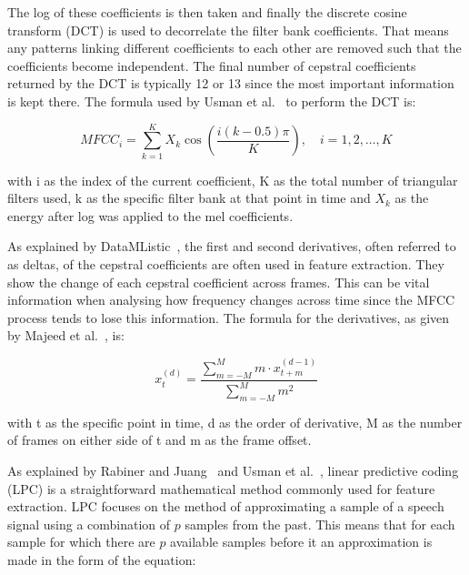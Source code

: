 The log of these coefficients is then taken and finally the discrete cosine transform 
(\acs{DCT}) is used to decorrelate the filter bank coefficients. That means any patterns linking different coefficients to each 
other are removed such that the coefficients become independent. 
The final number of cepstral 
coefficients returned by the \acs{DCT} is typically 12 or 13 since the most important information 
is kept there. The formula used by Usman et al.~\cite{Det_Tech} to perform the \acs{DCT} is:

\begin{equation}
    MFCC_i = \sum_{k=1}^{K} X_k \cos\left(\frac{i(k - 0.5)\pi}{K}\right), \quad i = 1, 2, \dots, K
\end{equation}

with i as the index of the current coefficient, K as the total number of triangular filters 
used, k as the specific filter bank at that point in time and $X_k$ as the energy after log was 
applied to the mel coefficients.

As explained by DataMListic~\cite{deltas}\cite{mel_delta}, the first and second derivatives, often referred to as deltas, of the cepstral coefficients 
are often used in feature extraction. They show the change of each cepstral coefficient across frames. This can be vital information when analysing how frequency changes across 
time since the \acs{MFCC} process tends to lose this information. The formula for the derivatives, 
as given by Majeed et al.~\cite{melderv_calcs}, 
is:

\begin{equation}
    x^{(d)}_t = \frac{\sum_{m=-M}^{M} m \cdot x^{(d-1)}_{t+m}}{\sum_{m=-M}^{M} m^2}
\end{equation}

with t as the specific point in time, d as the order of derivative, M as the number of frames on either side of t 
and m as the frame offset.

\label{sec:linear-predictive-coding}
As explained by Rabiner and Juang~\cite{lpc} and Usman et al.~\cite{Det_Tech}, linear predictive coding (\acs{LPC}) is a straightforward mathematical method commonly 
used for feature extraction. \acs{LPC} focuses on the method of approximating a sample of a 
speech signal using a combination of $p$ samples from the past. This means that for each 
sample for which there are $p$ available samples before it an approximation is made in the 
form of the equation:

